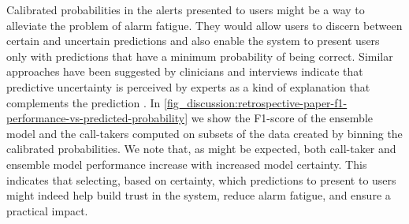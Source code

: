Calibrated probabilities in the alerts presented to users might be a way to alleviate the problem of alarm fatigue. They would allow users to discern between certain and uncertain predictions and also enable the system to present users only with predictions that have a minimum probability of being correct. Similar approaches have been suggested by clinicians and interviews indicate that predictive uncertainty is perceived by experts as a kind of explanation that complements the prediction \cite{tonekaboni_what_2019}. In \cref{fig_discussion:retrospective-paper-f1-performance-vs-predicted-probability} we show the F1-score of the ensemble model and the call-takers computed on subsets of the data created by binning the calibrated probabilities. We note that, as might be expected, both call-taker and ensemble model performance increase with increased model certainty. This indicates that selecting, based on certainty, which predictions to present to users might indeed help build trust in the system, reduce alarm fatigue, and ensure a practical impact. 
